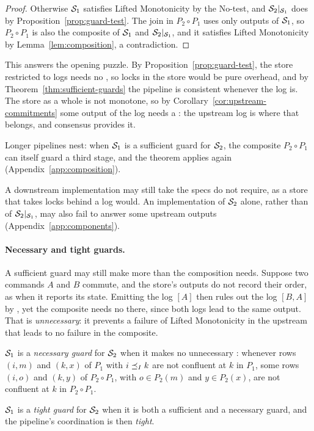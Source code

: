 \begin{proof}
Otherwise $\mathcal{S}_1$ satisfies Lifted Monotonicity by the No-\commitment test,
and $\mathcal{S}_2|_{\mathcal{S}_1}$ does by Proposition~\ref{prop:guard-test}.  The join
in $P_2\circ P_1$ uses only outputs of $\mathcal{S}_1$, so $P_2\circ P_1$ is also the
composite of $\mathcal{S}_1$ and $\mathcal{S}_2|_{\mathcal{S}_1}$, and it satisfies Lifted
Monotonicity by Lemma~\ref{lem:composition}, a contradiction.
\end{proof}

This answers the opening puzzle.  By Proposition~\ref{prop:guard-test}, the
store restricted to logs needs no \commitment, so locks in the store would be
pure overhead, and by Theorem~\ref{thm:sufficient-guards} the pipeline is
consistent whenever the log is.  The store as a whole is not monotone, so by
Corollary~\ref{cor:upstream-commitments} some output of the log needs a
\commitment: the upstream log is where that belongs, and consensus provides
it.

Longer pipelines nest: when $\mathcal{S}_1$ is a sufficient guard for $\mathcal{S}_2$,
the composite $P_2\circ P_1$ can itself guard a third stage, and the theorem applies again
(Appendix~\ref{app:composition}).

A downstream implementation may still take \commitments the specs do not
require, as a store that takes locks behind a log would.  An implementation of
$\mathcal{S}_2$ alone, rather than of $\mathcal{S}_2|_{\mathcal{S}_1}$, may also fail to answer
some upstream outputs (Appendix~\ref{app:components}).

\paragraph{Necessary and tight guards.}
A sufficient guard may still make more \commitments than the composition
needs.  Suppose two commands $A$ and $B$ commute,
and the store's outputs do not record their order, as when it reports its
state.  Emitting the log $[A]$ then rules out the log $[B,A]$ by \commitment,
yet the composite needs no \commitment there, since both logs lead to the same
output.  That \commitment is \emph{unnecessary}: it prevents a
failure of Lifted Monotonicity in the upstream that leads to no failure in the
composite.

\begin{definition}
\label{def:necessary-guard}
\label{def:tight-guard}
$\mathcal{S}_1$ is a \emph{necessary guard} for $\mathcal{S}_2$ when it makes no
unnecessary \commitment: whenever rows $(i,m)$ and $(k,x)$
of $P_1$ with $i\preceq_I k$ are not confluent at $k$ in $P_1$, some rows
$(i,o)$ and $(k,y)$ of $P_2\circ P_1$, with $o\in P_2(m)$ and $y\in P_2(x)$,
are not confluent at $k$ in $P_2\circ P_1$.

$\mathcal{S}_1$ is a \emph{tight guard} for $\mathcal{S}_2$ when it is both a
sufficient and a necessary guard, and the pipeline's coordination is then
\emph{tight}.
\end{definition}

